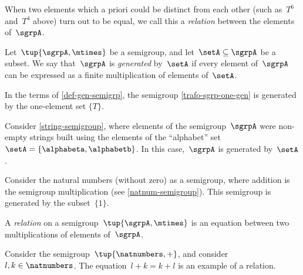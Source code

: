 When two elements which a priori could be distinct from each other (such as~$T^6$ and~$T^4$ above) turn out to be equal, we call this a \emph{relation} between the elements of~$\sgrpA$.

\begin{definition}\label{def-gen-semigrp}
Let~$\tup{\sgrpA, \mtimes}$ be a semigroup, and let~$\setA \subseteq \sgrpA$ be a subset.
We say that~$\sgrpA$ is \emph{generated} by~$\setA$ if every element of~$\sgrpA$ can be expressed as a finite multiplication of elements of~$\setA$.
\end{definition}

\begin{remark}
In the terms of \cref{def-gen-semigrp}, the semigroup \cref{trafo-sgrp-one-gen} is generated by the one-element set $\{ T \}$. 
\end{remark}

\begin{example}
Consider \cref{string-semigroup}, where elements of the semigroup~$\sgrpA$ were non-empty strings built using the elements of the ``alphabet'' set~$\setA = \{ \alphabeta, \alphabetb\}$.
In this case,~$\sgrpA$ is generated by~$\setA$.
\end{example}


\begin{example}
Consider the natural numbers (without zero) as a semigroup, where addition is the semigroup multiplication (see \cref{natnum-semigroup}). This semigroup is generated by the subset~$\{1 \}$.
\end{example}

\begin{definition}
A \emph{relation} on a semigroup~$\tup{\sgrpA, \mtimes}$ is an equation between two multiplications of elements of~$\sgrpA$.
\end{definition}

\begin{example}
Consider the semigroup~$\tup{\natnumbers, +}$, and consider~$l, k \in \natnumbers$. The equation~$l + k = k + l$ is an example of  a relation.
\end{example}


